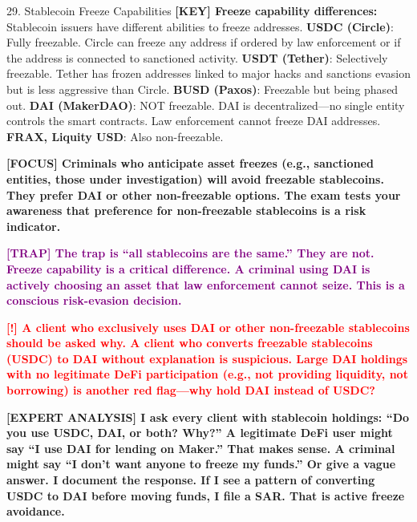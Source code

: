 \documentclass[11pt,a4paper]{beamer}
\newcommand{\redflag}[1]{\textcolor{red}{\textbf{[!] #1}}}
\newcommand{\examfocus}[1]{\textcolor{orange!80!black}{\textbf{[FOCUS] #1}}}
\newcommand{\trap}[1]{\textcolor{purple}{\textbf{[TRAP] #1}}}
\newcommand{\keyterm}[1]{\textcolor{red!80!black}{\textbf{[KEY] #1}}}
\newcommand{\expert}[1]{\textcolor{blue!70!black}{\textbf{[EXPERT ANALYSIS] #1}}}
\begin{document}
	\begin{frame}{29. Stablecoin Freeze Capabilities}
		\tiny
		\keyterm{Freeze capability differences:} Stablecoin issuers have different abilities to freeze addresses. \textbf{USDC (Circle)}: Fully freezable. Circle can freeze any address if ordered by law enforcement or if the address is connected to sanctioned activity. \textbf{USDT (Tether)}: Selectively freezable. Tether has frozen addresses linked to major hacks and sanctions evasion but is less aggressive than Circle. \textbf{BUSD (Paxos)}: Freezable but being phased out. \textbf{DAI (MakerDAO)}: NOT freezable. DAI is decentralized—no single entity controls the smart contracts. Law enforcement cannot freeze DAI addresses. \textbf{FRAX, Liquity USD}: Also non-freezable.
		
		\vspace{0.1cm}
		\examfocus{Criminals who anticipate asset freezes (e.g., sanctioned entities, those under investigation) will avoid freezable stablecoins. They prefer DAI or other non-freezable options. The exam tests your awareness that preference for non-freezable stablecoins is a risk indicator.}
		
		\vspace{0.1cm}
		\trap{The trap is “all stablecoins are the same.” They are not. Freeze capability is a critical difference. A criminal using DAI is actively choosing an asset that law enforcement cannot seize. This is a conscious risk-evasion decision.}
		
		\vspace{0.1cm}
		\redflag{A client who exclusively uses DAI or other non-freezable stablecoins should be asked why. A client who converts freezable stablecoins (USDC) to DAI without explanation is suspicious. Large DAI holdings with no legitimate DeFi participation (e.g., not providing liquidity, not borrowing) is another red flag—why hold DAI instead of USDC?}
		
		\vspace{0.1cm}
		\expert{I ask every client with stablecoin holdings: “Do you use USDC, DAI, or both? Why?” A legitimate DeFi user might say “I use DAI for lending on Maker.” That makes sense. A criminal might say “I don't want anyone to freeze my funds.” Or give a vague answer. I document the response. If I see a pattern of converting USDC to DAI before moving funds, I file a SAR. That is active freeze avoidance.}
	\end{frame}
	
\end{document}
